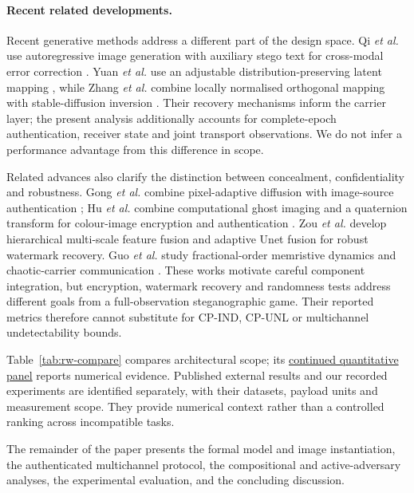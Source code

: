 \documentclass[pdflatex,sn-mathphys-num]{sn-jnl}%
\theoremstyle{definition}
\theoremstyle{game}
\theoremstyle{thmstyleone}%
\theoremstyle{thmstyletwo}%
\theoremstyle{thmstylethree}%
\begin{document}
\paragraph{Recent related developments.}
Recent generative methods address a different part of the design space.
Qi \emph{et al.} use autoregressive image generation with auxiliary stego
text for cross-modal error correction \cite{qi2025provably}. Yuan
\emph{et al.} use an adjustable distribution-preserving latent mapping
\cite{yuan2026provably}, while Zhang \emph{et al.} combine locally normalised
orthogonal mapping with stable-diffusion inversion \cite{Zhang2026MappingDiffusion}.
Their recovery mechanisms inform the carrier layer; the present analysis
additionally accounts for complete-epoch authentication, receiver state and
joint transport observations. We do not infer a performance advantage from
this difference in scope.

Related advances also clarify the distinction between concealment,
confidentiality and robustness. Gong \emph{et al.} combine pixel-adaptive
diffusion with image-source authentication \cite{Gong2026PixelDiffusion};
Hu \emph{et al.} combine computational ghost imaging and a quaternion
transform for colour-image encryption and authentication
\cite{Hu2026GhostAuthentication}. Zou \emph{et al.} develop hierarchical
multi-scale feature fusion \cite{Zou2025HRFMS} and adaptive Unet fusion
\cite{Zou2026WeightedUnet} for robust watermark recovery. Guo
\emph{et al.} study fractional-order memristive dynamics and chaotic-carrier
communication \cite{Guo2026Memristive}. These works motivate careful
component integration, but encryption, watermark recovery and randomness
tests address different goals from a full-observation steganographic game.
Their reported metrics therefore cannot substitute for CP-IND, CP-UNL or
multichannel undetectability bounds.

Table~\ref{tab:rw-compare} compares architectural scope; its
\hyperref[tab:rw-quantitative]{continued quantitative panel} reports numerical evidence. Published
external results and our recorded experiments are identified separately,
with their datasets, payload units and measurement scope. They provide
numerical context rather than a controlled ranking across incompatible tasks.

The remainder of the paper presents the formal model and image instantiation, the authenticated multichannel protocol, the compositional and active-adversary analyses, the experimental evaluation, and the concluding discussion.
\end{document}
